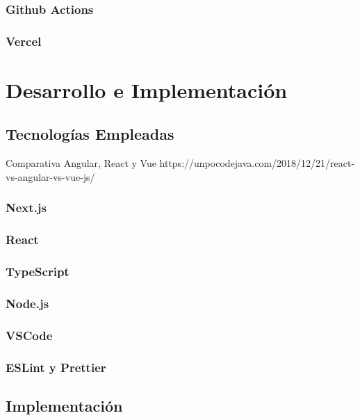 \documentclass[12pt,twoside,titlepage]{report}
\begin{document}
\subsubsection{Github Actions}
\subsubsection{Vercel}

\section{Desarrollo e Implementación}

\subsection{Tecnologías Empleadas}

Comparativa Angular, React y Vue
https://unpocodejava.com/2018/12/21/react-vs-angular-vs-vue-js/

\subsubsection{Next.js}

\subsubsection{React}

\subsubsection{TypeScript}

\subsubsection{Node.js}

\subsubsection{VSCode}

\subsubsection{ESLint y Prettier}

\subsection{Implementación}
\end{document}
